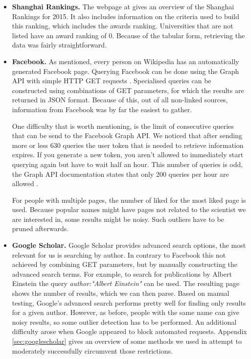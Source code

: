 \begin{itemize}
\item{\textbf{Shanghai Rankings. }} 	
The webpage at \cite{rankings} gives an overview of the Shanghai Rankings for 2015. 
It also includes  information on the criteria used to build this ranking, which includes the awards ranking. Universities that are not listed have an award ranking of 0. Because of the tabular form, retrieving the data was fairly straightforward.

\item{\textbf{Facebook. }} As mentioned, every person on Wikipedia has an automatically generated Facebook page. Querying Facebook can be done using the Graph API with simple HTTP GET requests \cite{graphAPI}. Specialised queries can be constructed using combinations of GET parameters, for which the results are returned in JSON format. Because of this, out of all non-linked sources, information from Facebook was by far the easiest to gather. 

One difficulty that is worth mentioning, is the limit of consecutive queries that can be send to the Facebook Graph API. We noticed that after sending more or less 630 queries the user token that is needed to retrieve information expires. If you generate a new token, you aren't allowed to immediately start querying again but have to wait half an hour. This number of queries is odd, the Graph API documentation states that only 200 queries per hour are allowed \cite{graphAPIlimit}.


For people with multiple pages, the number of liked for the most liked page is used. Because popular names might have pages not related to the scientist we are interested in, some results might be noisy. Such outliers have to be pruned afterwards.

\item{\textbf{Google Scholar. }} Google Scholar provides advanced search options, the most relevant for us is searching by author. In contrary to Facebook this not achieved by combining GET parameters, but by manually constructing the advanced search terms. For example, to search for publications by Albert Einstein the query  \emph{author:"Albert Einstein"} can be used. The resulting page shows the number of results, which we can then parse. Based on manual testing, Google's advanced search performs pretty well for finding only results for a given author. However, as before, people with the same name can give noisy results, so some outlier detection has to be performed. An additional difficulty arose when Google appeared to block automated requests. Appendix \ref{sec:googlescholar} gives an overview of some methods we used in attempt to moderately successfully circumvent those restrictions.
\end{itemize}


